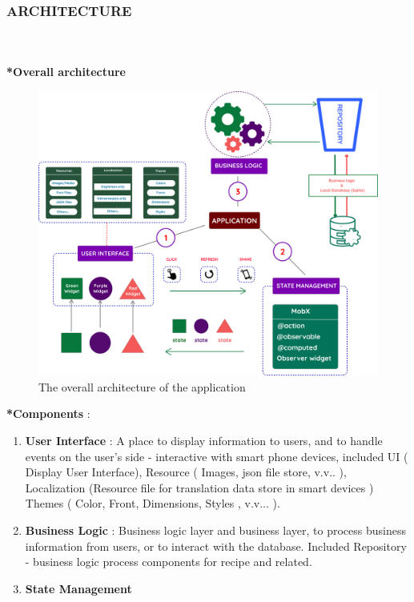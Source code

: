 \documentclass{article}
\begin{document}
\subsubsection{ARCHITECTURE}  \\ \\ 
\textbf{*Overall architecture} \\
\begin{figure}[h!]
    \centering
    \includegraphics[scale=0.11]{Images/app-architecture.png}
    \caption{The overall architecture of the application}
    \label{fig:cookingbook}
\end{figure}

\textbf{*Components} :
    \begin{enumerate}
        \item \textbf{User Interface} : A place to display information to users, and to handle events on the user's side - interactive with smart phone devices, included UI ( Display User Interface), Resource ( Images, json file store, v.v.. ), Localization (Resource file for translation data store in smart devices ) Themes ( Color, Front, Dimensions, Styles , v.v... ). 
        \item \textbf{Business Logic } : Business logic layer and business layer, to process business information from users, or to interact with the database. Included Repository - business logic process components for recipe and related.
        \item \textbf{ State Management } 
    \end{enumerate}
\newpage
\end{document}
